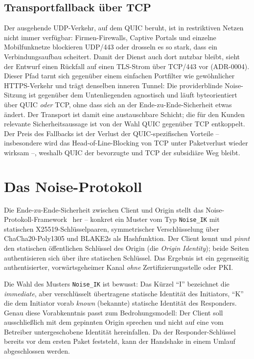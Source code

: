 \subsection{Transportfallback über TCP}
\label{sec:quic-fallback}

Der ausgehende UDP-Verkehr, auf dem QUIC beruht, ist in restriktiven Netzen nicht
immer verfügbar: Firmen-Firewalls, Captive Portals und einzelne Mobilfunknetze
blockieren UDP/443 oder drosseln es so stark, dass ein Verbindungsaufbau
scheitert. Damit der Dienst auch dort nutzbar bleibt, sieht der Entwurf einen
Rückfall auf einen TLS-Strom über TCP/443 vor (ADR-0004). Dieser Pfad tarnt sich
gegenüber einem einfachen Portfilter wie gewöhnlicher HTTPS-Verkehr und trägt
denselben inneren Tunnel: Die providerblinde Noise-Sitzung ist gegenüber dem
Untenliegenden agnostisch und läuft byteorientiert über QUIC \emph{oder} TCP,
ohne dass sich an der Ende-zu-Ende-Sicherheit etwas ändert. Der Transport ist
damit eine austauschbare Schicht; die für den Kunden relevante Sicherheitsaussage
ist von der Wahl QUIC gegenüber TCP entkoppelt. Der Preis des Fallbacks ist der
Verlust der QUIC-spezifischen Vorteile -- insbesondere wird das
Head-of-Line-Blocking von TCP unter Paketverlust wieder wirksam --, weshalb QUIC
der bevorzugte und TCP der subsidiäre Weg bleibt.

\section{Das Noise-Protokoll}
\label{sec:noise}

Die Ende-zu-Ende-Sicherheit zwischen Client und Origin stellt das
Noise-Protokoll-Framework~\cite{noiseprotocol} her -- konkret ein Muster vom Typ
\texttt{Noise\_IK} mit statischen X25519-Schlüsselpaaren, symmetrischer
Verschlüsselung über ChaCha20-Poly1305 und BLAKE2s als Hashfunktion. Der Client
kennt und \emph{pinnt} den statischen öffentlichen Schlüssel des Origin (die
\emph{Origin Identity}); beide Seiten authentisieren sich über ihre statischen
Schlüssel. Das Ergebnis ist ein gegenseitig authentisierter, vorwärtsgeheimer
Kanal \emph{ohne} Zertifizierungsstelle oder PKI.

Die Wahl des Musters \texttt{Noise\_IK} ist bewusst: Das Kürzel \enquote{I}
bezeichnet die \emph{immediate}, aber verschlüsselt übertragene statische
Identität des Initiators, \enquote{K} die dem Initiator vorab \emph{known}
(bekannte) statische Identität des Responders. Genau diese Vorabkenntnis passt
zum Bedrohungsmodell: Der Client soll ausschließlich mit dem gepinnten Origin
sprechen und nicht auf eine vom Betreiber untergeschobene Identität hereinfallen.
Da der Responder-Schlüssel bereits vor dem ersten Paket feststeht, kann der
Handshake in einem Umlauf abgeschlossen werden.

